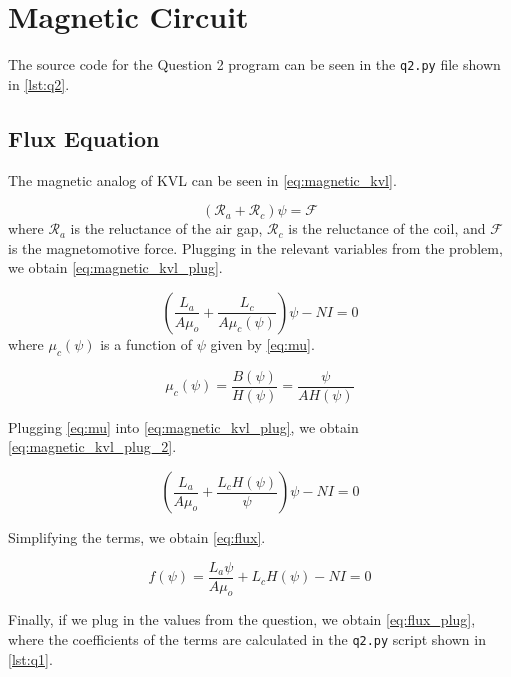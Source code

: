 \documentclass[a4paper,titlepage]{article}
\begin{document}
	\section{Magnetic Circuit}
	The source code for the Question 2 program can be seen in the \texttt{q2.py} file shown in \cref{lst:q2}.
	
	\subsection{Flux Equation}
	The magnetic analog of KVL can be seen in \cref{eq:magnetic_kvl}.

	\begin{equation} \label{eq:magnetic_kvl}
		(\mathcal{R}_a + \mathcal{R}_c) \psi = \mathcal{F}
	\end{equation}
	where $\mathcal{R}_a$ is the reluctance of the air gap, $\mathcal{R}_c$ is the reluctance of the coil, and $\mathcal{F}$ is the magnetomotive force. Plugging in the relevant variables from the problem, we obtain \cref{eq:magnetic_kvl_plug}.

	\begin{equation} \label{eq:magnetic_kvl_plug}
		\left( \frac{L_a}{A \mu_o} + \frac{L_c}{A \mu_c(\psi)} \right) \psi - NI = 0
	\end{equation}
	where $\mu_c(\psi)$ is a function of $\psi$ given by \cref{eq:mu}.
	
	\begin{equation} \label{eq:mu}
		\mu_c(\psi) = \frac{B(\psi)}{H(\psi)} = \frac{\psi}{A H(\psi)}
	\end{equation}
	
	Plugging \cref{eq:mu} into \cref{eq:magnetic_kvl_plug}, we obtain \cref{eq:magnetic_kvl_plug_2}.
	
	\begin{equation} \label{eq:magnetic_kvl_plug_2}
		\left( \frac{L_a}{A \mu_o} + \frac{L_c H(\psi)}{\psi} \right) \psi - NI = 0
	\end{equation}
	
	Simplifying the terms, we obtain \cref{eq:flux}.
	
	\begin{equation} \label{eq:flux}
		f(\psi) = \frac{L_a \psi}{A \mu_o} + L_c H(\psi) - NI = 0
	\end{equation}
	
	Finally, if we plug in the values from the question, we obtain \cref{eq:flux_plug}, where the coefficients of the terms are calculated in the \texttt{q2.py} script shown in \cref{lst:q1}.
	
\end{document}

